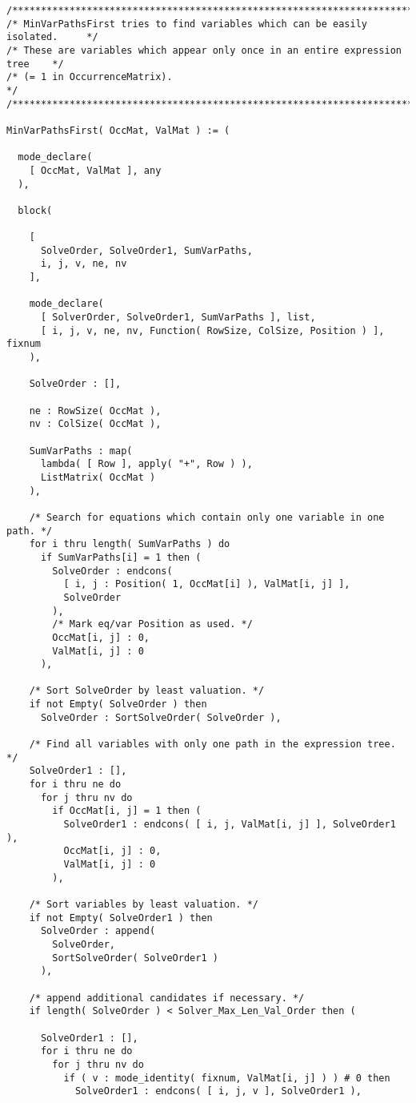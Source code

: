\begin{verbatim}
/******************************************************************************/
/* MinVarPathsFirst tries to find variables which can be easily isolated.     */
/* These are variables which appear only once in an entire expression tree    */
/* (= 1 in OccurrenceMatrix).                                                 */
/******************************************************************************/

MinVarPathsFirst( OccMat, ValMat ) := (

  mode_declare(
    [ OccMat, ValMat ], any
  ),

  block(

    [
      SolveOrder, SolveOrder1, SumVarPaths,
      i, j, v, ne, nv
    ],

    mode_declare(
      [ SolverOrder, SolveOrder1, SumVarPaths ], list,
      [ i, j, v, ne, nv, Function( RowSize, ColSize, Position ) ], fixnum
    ),

    SolveOrder : [],

    ne : RowSize( OccMat ),
    nv : ColSize( OccMat ),

    SumVarPaths : map(
      lambda( [ Row ], apply( "+", Row ) ),
      ListMatrix( OccMat )
    ),

    /* Search for equations which contain only one variable in one path. */
    for i thru length( SumVarPaths ) do
      if SumVarPaths[i] = 1 then (
        SolveOrder : endcons(
          [ i, j : Position( 1, OccMat[i] ), ValMat[i, j] ],
          SolveOrder
        ),
        /* Mark eq/var Position as used. */
        OccMat[i, j] : 0,
        ValMat[i, j] : 0
      ),

    /* Sort SolveOrder by least valuation. */
    if not Empty( SolveOrder ) then
      SolveOrder : SortSolveOrder( SolveOrder ),

    /* Find all variables with only one path in the expression tree. */
    SolveOrder1 : [],
    for i thru ne do
      for j thru nv do
        if OccMat[i, j] = 1 then (
          SolveOrder1 : endcons( [ i, j, ValMat[i, j] ], SolveOrder1 ),
          OccMat[i, j] : 0,
          ValMat[i, j] : 0
        ),

    /* Sort variables by least valuation. */
    if not Empty( SolveOrder1 ) then
      SolveOrder : append(
        SolveOrder,
        SortSolveOrder( SolveOrder1 )
      ),

    /* append additional candidates if necessary. */
    if length( SolveOrder ) < Solver_Max_Len_Val_Order then (

      SolveOrder1 : [],
      for i thru ne do
        for j thru nv do
          if ( v : mode_identity( fixnum, ValMat[i, j] ) ) # 0 then
            SolveOrder1 : endcons( [ i, j, v ], SolveOrder1 ),


\end{verbatim}

